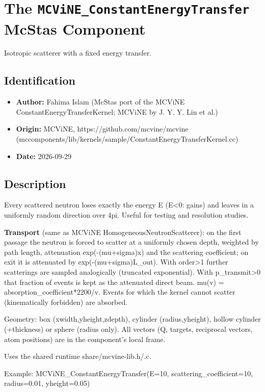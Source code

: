 \section{The \texttt{MCViNE\_ConstantEnergyTransfer} McStas Component}
Isotropic scatterer with a fixed energy transfer.

\subsection*{Identification}
\begin{itemize}
  \item \textbf{Author:} Fahima Islam (McStas port of the MCViNE ConstantEnergyTransferKernel; MCViNE by J. Y. Y. Lin et al.)
  \item \textbf{Origin:} MCViNE, https://github.com/mcvine/mcvine (mccomponents/lib/kernels/sample/ConstantEnergyTransferKernel.cc)
  \item \textbf{Date:} 2026-09-29
\end{itemize}

\subsection*{Description}
Every scattered neutron loses exactly the energy E (E\textless{}0: gains) and leaves in a uniformly random direction over 4pi. Useful for testing and resolution studies.

\textbf{Transport} (same as MCViNE HomogeneousNeutronScatterer): on the first passage the neutron is forced to scatter at a uniformly chosen depth, weighted by path length, attenuation exp(-(mu+sigma)x) and the scattering coefficient; on exit it is attenuated by exp(-(mu+sigma)L\_out). With order\textgreater{}1 further scatterings are sampled analogically (truncated exponential). With p\_transmit\textgreater{}0 that fraction of events is kept as the attenuated direct beam. mu(v) = absorption\_coefficient*2200/v. Events for which the kernel cannot scatter (kinematically forbidden) are absorbed.

Geometry: box (xwidth,yheight,zdepth), cylinder (radius,yheight), hollow cylinder (+thickness) or sphere (radius only). All vectors (Q, targets, reciprocal vectors, atom positions) are in the component's local frame.

Uses the shared runtime share/mcvine-lib.h/.c.

Example: MCViNE\_ConstantEnergyTransfer(E=10, scattering\_coefficient=10, radius=0.01, yheight=0.05)

